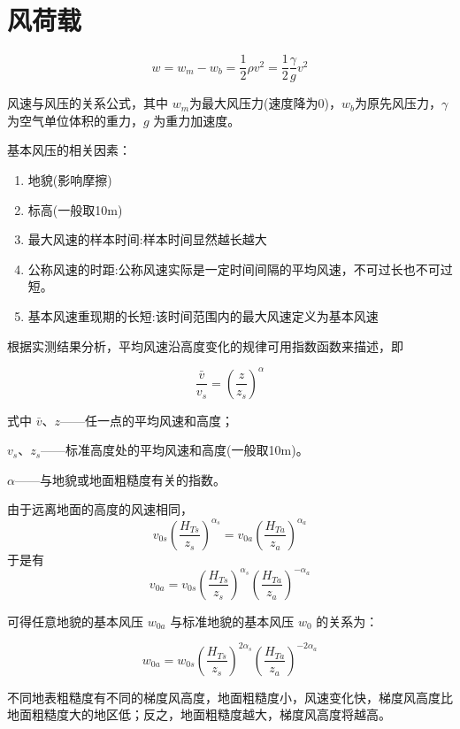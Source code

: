 \documentclass[12pt, a4paper, oneside, UTF8]{ctexbook}
\begin{document}

\else
\fi

\chapter{风荷载}

\begin{theorem}
$$
w = w_m - w_b = \frac{1}{2} \rho v^2 = \frac{1}{2} \frac{\gamma}{g} v^2
$$

风速与风压的关系公式，其中 $w_m$为最大风压力(速度降为0)，$w_b$为原先风压力，$\gamma$ 为空气单位体积的重力，$g$ 为重力加速度。
\end{theorem}

基本风压的相关因素：

\begin{enumerate}
    \item 地貌(影响摩擦)
    \item 标高(一般取10m)
    \item 最大风速的样本时间:样本时间显然越长越大
    \item 公称风速的时距:公称风速实际是一定时间间隔的平均风速，不可过长也不可过短。
    \item 基本风速重现期的长短:{\color{red}该时间范围内的最大风速定义为基本风速}
\end{enumerate}

\begin{definition}
    根据实测结果分析，平均风速沿高度变化的规律可用指数函数来描述，即

$$
\frac{\bar{v}}{v_s} = \left( \frac{z}{z_s} \right)^\alpha
$$

式中 $\bar{v}$、$z$——任一点的平均风速和高度；

$v_s$、$z_s$——标准高度处的平均风速和高度(一般取10m)。

$\alpha$——与地貌或地面粗糙度有关的指数。
\end{definition}

由于远离地面的高度的风速相同，$$v_{0s} \left( \frac{H_{Ts}}{z_s} \right)^{\alpha_s} = v_{0a} \left( \frac{H_{Ta}}{z_a} \right)^{\alpha_a}$$
于是有
\[
v_{0a} = v_{0s} \left( \frac{H_{Ts}}{z_s} \right)^{\alpha_s} \left( \frac{H_{Ta}}{z_a} \right)^{-\alpha_a} 
\]

可得任意地貌的基本风压 \(w_{0a}\) 与标准地貌的基本风压 \(w_0\) 的关系为：

\[
w_{0a} = w_{0s} \left( \frac{H_{Ts}}{z_s} \right)^{2\alpha_s} \left( \frac{H_{Ta}}{z_a} \right)^{-2\alpha_a} 
\]

不同地表粗糙度有不同的梯度风高度，地面粗糙度小，风速变化快，梯度风高度比地面粗糙度大的地区低；反之，地面粗糙度越大，梯度风高度将越高。
\end{document}
